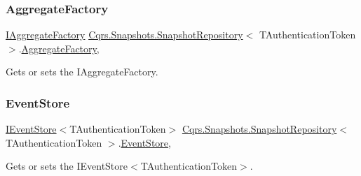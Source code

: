 \subsubsection{\texorpdfstring{Aggregate\+Factory}{AggregateFactory}}
{\footnotesize\ttfamily \hyperlink{interfaceCqrs_1_1Domain_1_1Factories_1_1IAggregateFactory}{I\+Aggregate\+Factory} \hyperlink{classCqrs_1_1Snapshots_1_1SnapshotRepository}{Cqrs.\+Snapshots.\+Snapshot\+Repository}$<$ T\+Authentication\+Token $>$.\hyperlink{classCqrs_1_1Domain_1_1Factories_1_1AggregateFactory}{Aggregate\+Factory}\hspace{0.3cm}{\ttfamily [get]}, {\ttfamily [protected]}}



Gets or sets the I\+Aggregate\+Factory. 

\mbox{\label{classCqrs_1_1Snapshots_1_1SnapshotRepository_a34f46341da207beab43bb96b20514976_a34f46341da207beab43bb96b20514976}} 
\subsubsection{\texorpdfstring{Event\+Store}{EventStore}}
{\footnotesize\ttfamily \hyperlink{interfaceCqrs_1_1Events_1_1IEventStore}{I\+Event\+Store}$<$T\+Authentication\+Token$>$ \hyperlink{classCqrs_1_1Snapshots_1_1SnapshotRepository}{Cqrs.\+Snapshots.\+Snapshot\+Repository}$<$ T\+Authentication\+Token $>$.\hyperlink{classCqrs_1_1Events_1_1EventStore}{Event\+Store}\hspace{0.3cm}{\ttfamily [get]}, {\ttfamily [protected]}}



Gets or sets the I\+Event\+Store$<$\+T\+Authentication\+Token$>$. 

\mbox{\label{classCqrs_1_1Snapshots_1_1SnapshotRepository_a64b1457cd45056fb7affd2aa8cd07d9e_a64b1457cd45056fb7affd2aa8cd07d9e}} 
